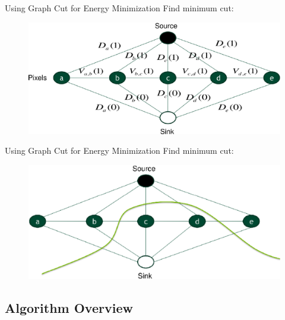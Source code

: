 \documentclass{beamer}
\begin{document}
\begin{frame}{Using Graph Cut for Energy Minimization}
   Find minimum cut:
   \begin{figure}
   \includegraphics[scale=0.5]{graph} 
   \end{figure}
\end{frame}

\begin{frame}{Using Graph Cut for Energy Minimization}
   Find minimum cut:
   \begin{figure}
   \includegraphics[scale=0.5]{graph2} 
   \end{figure}
\end{frame}

\subsection{Algorithm Overview}
\end{document}
